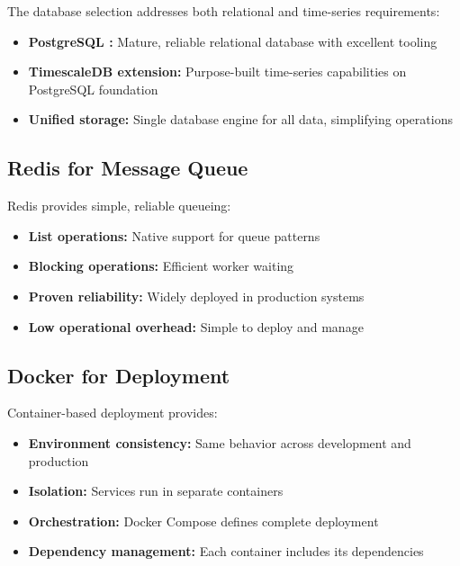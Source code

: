 \documentclass[a4paper,12pt]{report}
\begin{document}
The database selection addresses both relational and time-series requirements:\hfill

\begin{itemize}
\item \textbf{PostgreSQL \cite{postgresql_docs}:} Mature, reliable relational database with excellent tooling
\item \textbf{TimescaleDB \cite{timescaledb_docs} extension:} Purpose-built time-series capabilities on PostgreSQL foundation
\item \textbf{Unified storage:} Single database engine for all data, simplifying operations
\end{itemize}

\subsection{Redis for Message Queue}

Redis provides simple, reliable queueing:\hfill

\begin{itemize}
\item \textbf{List operations:} Native support for queue patterns
\item \textbf{Blocking operations:} Efficient worker waiting
\item \textbf{Proven reliability:} Widely deployed in production systems
\item \textbf{Low operational overhead:} Simple to deploy and manage
\end{itemize}

\subsection{Docker for Deployment}

Container-based deployment provides:

\begin{itemize}
\item \textbf{Environment consistency:} Same behavior across development and production
\item \textbf{Isolation:} Services run in separate containers
\item \textbf{Orchestration:} Docker \cite{docker_docs} Compose \cite{docker_compose_docs} defines complete deployment
\item \textbf{Dependency management:} Each container includes its dependencies
\end{itemize}
\end{document}
